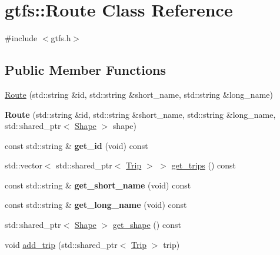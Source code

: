 \hypertarget{classgtfs_1_1Route}{}\section{gtfs\+:\+:Route Class Reference}
\label{classgtfs_1_1Route}


{\ttfamily \#include $<$gtfs.\+h$>$}

\subsection*{Public Member Functions}
\begin{DoxyCompactItemize}
\item 
\hyperlink{classgtfs_1_1Route_a32550fdfee780a26c596172184b86148}{Route} (std\+::string \&id, std\+::string \&short\+\_\+name, std\+::string \&long\+\_\+name)
\item 
\mbox{\label{classgtfs_1_1Route_aa216efacee7f9eeab810e044894d3ec0}} 
{\bfseries Route} (std\+::string \&id, std\+::string \&short\+\_\+name, std\+::string \&long\+\_\+name, std\+::shared\+\_\+ptr$<$ \hyperlink{classgtfs_1_1Shape}{Shape} $>$ shape)
\item 
\mbox{\label{classgtfs_1_1Route_a2d1ee4193b52ab7b8c7eb3160850cf71}} 
const std\+::string \& {\bfseries get\+\_\+id} (void) const
\item 
std\+::vector$<$ std\+::shared\+\_\+ptr$<$ \hyperlink{classgtfs_1_1Trip}{Trip} $>$ $>$ \hyperlink{classgtfs_1_1Route_a763ea7a09f20972019198515da6a1c05}{get\+\_\+trips} () const
\item 
\mbox{\label{classgtfs_1_1Route_a2a0fcdf687d5e326b20c5043c9db874f}} 
const std\+::string \& {\bfseries get\+\_\+short\+\_\+name} (void) const
\item 
\mbox{\label{classgtfs_1_1Route_aa943d312f934a91c3a56aec19d51cc90}} 
const std\+::string \& {\bfseries get\+\_\+long\+\_\+name} (void) const
\item 
std\+::shared\+\_\+ptr$<$ \hyperlink{classgtfs_1_1Shape}{Shape} $>$ \hyperlink{classgtfs_1_1Route_a4d3d7b29be342ae806041801327762a8}{get\+\_\+shape} () const
\item 
void \hyperlink{classgtfs_1_1Route_aa8a666e5a8f197835764874c983e6601}{add\+\_\+trip} (std\+::shared\+\_\+ptr$<$ \hyperlink{classgtfs_1_1Trip}{Trip} $>$ trip)
\end{DoxyCompactItemize}


